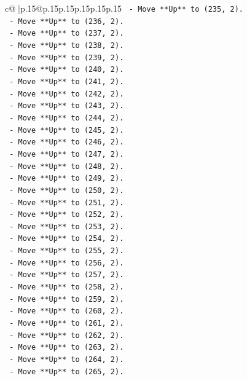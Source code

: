 \documentclass{article}
\begin{document}
{\begin{supertabular}{c@{$\;$}|p{.15\linewidth}@{}p{.15\linewidth}p{.15\linewidth}p{.15\linewidth}p{.15\linewidth}p{.15\linewidth}}
{{{\texttt{    {-} Move **Up** to (235, 2).} \\
\texttt{    {-} Move **Up** to (236, 2).} \\
\texttt{    {-} Move **Up** to (237, 2).} \\
\texttt{    {-} Move **Up** to (238, 2).} \\
\texttt{    {-} Move **Up** to (239, 2).} \\
\texttt{    {-} Move **Up** to (240, 2).} \\
\texttt{    {-} Move **Up** to (241, 2).} \\
\texttt{    {-} Move **Up** to (242, 2).} \\
\texttt{    {-} Move **Up** to (243, 2).} \\
\texttt{    {-} Move **Up** to (244, 2).} \\
\texttt{    {-} Move **Up** to (245, 2).} \\
\texttt{    {-} Move **Up** to (246, 2).} \\
\texttt{    {-} Move **Up** to (247, 2).} \\
\texttt{    {-} Move **Up** to (248, 2).} \\
\texttt{    {-} Move **Up** to (249, 2).} \\
\texttt{    {-} Move **Up** to (250, 2).} \\
\texttt{    {-} Move **Up** to (251, 2).} \\
\texttt{    {-} Move **Up** to (252, 2).} \\
\texttt{    {-} Move **Up** to (253, 2).} \\
\texttt{    {-} Move **Up** to (254, 2).} \\
\texttt{    {-} Move **Up** to (255, 2).} \\
\texttt{    {-} Move **Up** to (256, 2).} \\
\texttt{    {-} Move **Up** to (257, 2).} \\
\texttt{    {-} Move **Up** to (258, 2).} \\
\texttt{    {-} Move **Up** to (259, 2).} \\
\texttt{    {-} Move **Up** to (260, 2).} \\
\texttt{    {-} Move **Up** to (261, 2).} \\
\texttt{    {-} Move **Up** to (262, 2).} \\
\texttt{    {-} Move **Up** to (263, 2).} \\
\texttt{    {-} Move **Up** to (264, 2).} \\
\texttt{    {-} Move **Up** to (265, 2).} \\
}}}
\end{supertabular}}
\end{document}
